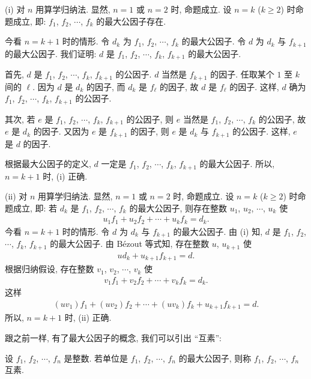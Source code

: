 \begin{pf}
    (i) 对 $n$ 用算学归纳法. 显然, $n = 1$ 或 $n = 2$ 时, 命题成立. 设 $n = k$ ($k \geq 2$) 时命题成立, 即: $f_1$, $f_2$, $\cdots$, $f_k$ 的最大公因子存在.

    今看 $n = k+1$ 时的情形. 令 $d_k$ 为 $f_1$, $f_2$, $\cdots$, $f_k$ 的最大公因子. 令 $d$ 为 $d_k$ 与 $f_{k+1}$ 的最大公因子. 我们证明: $d$ 是 $f_1$, $f_2$, $\cdots$, $f_k$, $f_{k+1}$ 的最大公因子.

    首先, $d$ 是 $f_1$, $f_2$, $\cdots$, $f_k$, $f_{k+1}$ 的公因子. $d$ 当然是 $f_{k+1}$ 的因子. 任取某个 $1$ 至 $k$ 间的 $\ell$. 因为 $d$ 是 $d_k$ 的因子, 而 $d_k$ 是 $f_{\ell}$ 的因子, 故 $d$ 是 $f_{\ell}$ 的因子. 这样, $d$ 确为 $f_1$, $f_2$, $\cdots$, $f_k$, $f_{k+1}$ 的公因子.

    其次, 若 $e$ 是 $f_1$, $f_2$, $\cdots$, $f_k$, $f_{k+1}$ 的公因子, 则 $e$ 当然是 $f_1$, $f_2$, $\cdots$, $f_{k}$ 的公因子, 故 $e$ 是 $d_k$ 的因子. 又因为 $e$ 是 $f_{k+1}$ 的因子, 则 $e$ 是 $d_k$ 与 $f_{k+1}$ 的公因子. 这样, $e$ 是 $d$ 的因子.

    根据最大公因子的定义, $d$ 一定是 $f_1$, $f_2$, $\cdots$, $f_k$, $f_{k+1}$ 的最大公因子. 所以, $n = k+1$ 时, (i) 正确.

    (ii) 对 $n$ 用算学归纳法. 显然, $n = 1$ 或 $n = 2$ 时, 命题成立. 设 $n = k$ ($k \geq 2$) 时命题成立, 即: 若 $d_k$ 是 $f_1$, $f_2$, $\cdots$, $f_k$ 的最大公因子, 则存在整数 $u_1$, $u_2$, $\cdots$, $u_k$ 使
    \begin{align*}
        u_1 f_1 + u_2 f_2 + \cdots + u_k f_k = d_k.
    \end{align*}
    今看 $n = k+1$ 时的情形. 令 $d$ 为 $d_k$ 与 $f_{k+1}$ 的最大公因子. 由 (i) 知, $d$ 是 $f_1$, $f_2$, $\cdots$, $f_k$, $f_{k+1}$ 的最大公因子. 由 Bézout 等式知, 存在整数 $u$, $u_{k+1}$ 使
    \begin{align*}
        u d_k + u_{k+1} f_{k+1} = d.
    \end{align*}
    根据归纳假设, 存在整数 $v_1$, $v_2$, $\cdots$, $v_k$ 使
    \begin{align*}
        v_1 f_1 + v_2 f_2 + \cdots + v_k f_k = d_k.
    \end{align*}
    这样
    \begin{align*}
        (uv_1) f_1 + (uv_2) f_2 + \cdots + (uv_k) f_k + u_{k+1} f_{k+1} = d.
    \end{align*}
    所以, $n = k+1$ 时, (ii) 正确.
\end{pf}

跟之前一样, 有了最大公因子的概念, 我们可以引出 ``互素'':
\begin{definition}
    设 $f_1$, $f_2$, $\cdots$, $f_n$ 是整数. 若单位是 $f_1$, $f_2$, $\cdots$, $f_n$ 的最大公因子, 则称 $f_1$, $f_2$, $\cdots$, $f_n$ 互素.
\end{definition}

